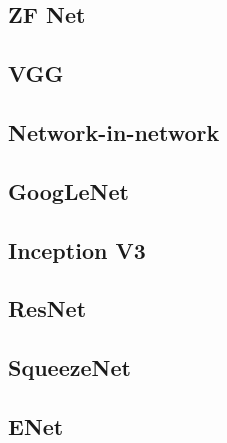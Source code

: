 
\subsection{ZF Net}
\label{zfnet}

\subsection{VGG} %
\label{vgg}

\subsection{Network-in-network}
\label{nin}

\subsection{GoogLeNet}
\label{googlenet}

\subsection{Inception V3}
\label{inception}

\subsection{ResNet} %
\label{resnet}

\subsection{SqueezeNet}
\label{squeezenet}

\subsection{ENet}
\label{enet}